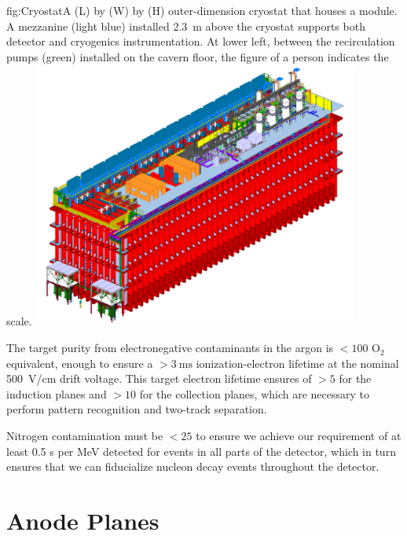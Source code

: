 \begin{dunefigure}{fig:Cryostat}{A  \cryostatlen (L) by \cryostatwdth (W) by \cryostatht{} (H) outer-dimension cryostat that houses a \nominalmodsize {} module. A mezzanine (light blue) installed \SI{2.3}{m} above the cryostat supports both  detector and cryogenics instrumentation. At lower left, between the \lar recirculation pumps (green) installed on the cavern floor,  the figure of a person indicates the scale.}
\includegraphics[width=0.8\textwidth]{graphics/cryostat-scale.png}
\end{dunefigure}

The target purity from electronegative contaminants in the argon is $<\!100$  O$_{2}$ equivalent, enough to ensure a $>\!\SI{3}{\milli\second}$ ionization-electron lifetime at the nominal \SI{500}{\volt/\centi\meter} drift voltage. This target electron lifetime ensures  of $>\!5$ for the induction planes and $>\!10$ for the collection planes, which are necessary to perform pattern recognition and two-track separation. 

Nitrogen contamination must be $<\!25$  to ensure we achieve our requirement of at least 0.5 \phel{}s per MeV detected for events in all parts of the detector, which in turn ensures 
that we can fiducialize nucleon decay events throughout the detector.

\section{Anode Planes}
\label{sec:exec-sp-apa}

